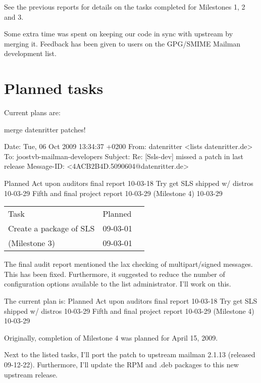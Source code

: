 \documentclass[a4]{article}
\begin{document}
See the previous reports for details on the tasks completed for
Milestones 1, 2 and 3.



Some extra time was spent on keeping our code in sync with upstream by merging
it.  Feedback has been given to users on the GPG/SMIME Mailman development
list.


\section{Planned tasks}

Current plans are:

merge datenritter patches!

Date: Tue, 06 Oct 2009 13:34:37 +0200
From: datenritter <lists datenritter.de>
To: joostvb-mailman-developers
Subject: Re: [Ssls-dev] missed a patch in last release
Message-ID: <4ACB2B4D.5090604@datenritter.de>



                                     Planned
 Act upon auditors final report      10-03-18
 Try get SLS shipped w/ distros      10-03-29
 Fifth and final project report      10-03-29
 (Milestone 4)                       10-03-29



\begin{tabular}{lll}
 Task                            & Planned  \\ \cline{1-2}
 Create a package of SLS         & 09-03-01 \\
 (Milestone 3)                   & 09-03-01 \\
\end{tabular}

The final audit report mentioned the lax checking of multipart/signed messages.
This has been fixed.  Furthermore, it suggested to reduce the number of
configuration options available to the list administrator.  I'll work on this.

The current plan is:
                                     Planned
 Act upon auditors final report      10-03-18
 Try get SLS shipped w/ distros      10-03-29
 Fifth and final project report      10-03-29
 (Milestone 4)                       10-03-29

Originally, completion of Milestone 4 was planned for April 15, 2009.

Next to the listed tasks, I'll port the patch to upstream mailman 2.1.13
(released 09-12-22).  Furthermore, I'll update the RPM and .deb packages to
this new upstream release.
\end{document}
